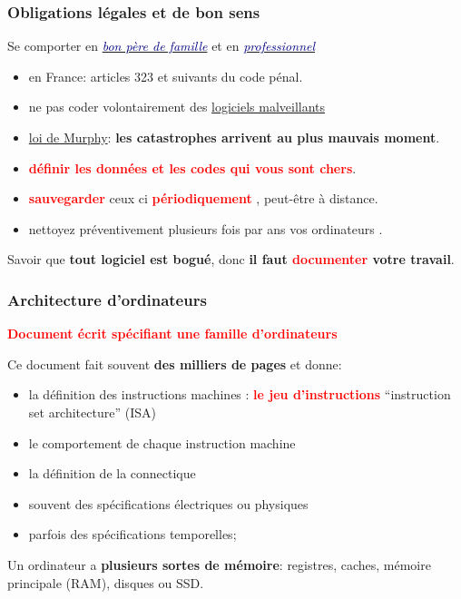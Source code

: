 \documentclass[lualatex,11pt,a4paper,svgnames,french]{beamer}
\newcommand{\clbrougras}[1]{{\textcolor{Red}{\textbf{#1}}}}
\begin{document}
\begin{frame}\frametitle{Obligations légales et de bon sens}

  Se comporter en \href{https://fr.wikipedia.org/wiki/Bon_père_de_famille}{\textit{\textcolor{Navy}{bon père de famille}}} et en
  \href{https://fr.wikipedia.org/wiki/Proffessionnel}{\textit{\textcolor{Navy}{professionnel}}}

      \begin{itemize}
      \item en France: articles 323 et suivants du code pénal.
      \item ne pas coder volontairement des \href{https://fr.wikipedia.org/wiki/Logiciel_malveillant}{logiciels malveillants}
        \item
          \href{https://fr.wikipedia.org/wiki/Loi_de_Murphy_(homonymie)}{loi
            de Murphy}: \textbf{les catastrophes arrivent au plus mauvais moment}.
        \item \clbrougras{définir les données et les codes qui vous sont chers}.
          \item \clbrougras{sauvegarder} ceux ci
            {} \clbrougras{périodiquement}
            {}, peut-être à
            distance.
            \item nettoyez préventivement plusieurs fois par ans vos
              ordinateurs {}.
      \end{itemize}

      Savoir que \textbf{tout logiciel est bogué}, donc \textbf{il
        faut \clbrougras{documenter} votre travail}.
\end{frame}

\begin{frame}\frametitle{Architecture d'ordinateurs}

  \clbrougras{Document écrit spécifiant une famille d'ordinateurs}
  \medskip
  

  Ce document fait souvent \textbf{des milliers de pages} et donne:
  \begin{itemize}
  \item la définition des instructions machines : \clbrougras{le jeu d'instructions} ``instruction set architecture'' (ISA)
  \item le comportement de chaque instruction machine
  \item la définition de la connectique  {}
  \item souvent des spécifications électriques ou physiques
  \item parfois des spécifications temporelles; {}
  \end{itemize}

  \bigskip
  Un ordinateur a \textbf{plusieurs sortes de mémoire}: registres,
  caches, mémoire principale (RAM), disques ou SSD.
\end{frame}
\end{document}
